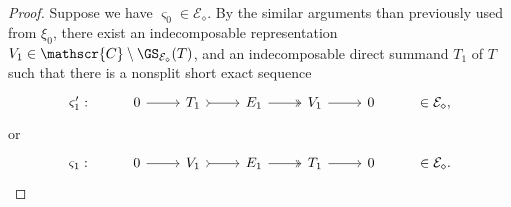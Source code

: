 \begin{proof}
Suppose we have $\varsigma_0 \in \mathcal{E}_\diamond$. By the similar arguments than previously used from $\xi_0$, there exist an indecomposable representation $V_1 \in \mathscr{C} \setminus \GS_{\mathcal{E}_\diamond}(T)$, and an indecomposable direct summand $T_1$ of $T$ such that there is a nonsplit short exact sequence  \[\begin{tikzcd}
	\varsigma_1': & 0 & T_1 & E_1 & V_1 &  0 & \in \mathcal{E}_\diamond,
	\arrow[from=1-2, to=1-3]
	\arrow[tail, from=1-3, to=1-4]
	\arrow[two heads,from=1-4, to=1-5]
	\arrow[from=1-5, to=1-6]
\end{tikzcd}\]  or \[\begin{tikzcd}
	\varsigma_1: & 0 & V_1 & E_1 & T_1 &  0 & \in \mathcal{E}_\diamond.
	\arrow[from=1-2, to=1-3]
	\arrow[tail, from=1-3, to=1-4]
	\arrow[two heads,from=1-4, to=1-5]
	\arrow[from=1-5, to=1-6]
\end{tikzcd}\] 


\end{proof}
